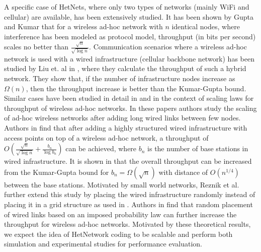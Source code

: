 \documentclass{sig-alternate-10pt}
\begin{document}
A specific case of HetNets, where only two types of networks (mainly WiFi and cellular) are available, has been extensively studied. It has been shown by Gupta and Kumar \cite{Gupta00thecapacity} that for a wireless ad-hoc network with $n$ identical nodes, where interference has been modeled as protocol model, throughput (in bits per second) scales no better than $\frac{\sqrt{n}}{\sqrt{\log{n}}}$. Communication scenarios where a wireless ad-hoc network is used with a wired infrastructure (cellular backbone network) has been studied by Liu et. al in  \cite{towsley03capacity}, where they calculate the throughput of such a hybrid network. They show that, if the number of infrastructure nodes increase as $\Omega(n)$, then the throughput increase is better than the Kumar-Gupta bound. Similar cases  have been studied in detail in  \cite{Kulkarni03throughputscaling} and \cite{Reznik04asmall} in the context of scaling laws for   throughput of  wireless ad-hoc networks. In these papers authors study the scaling of ad-hoc wireless networks after adding long wired links between few nodes.  Authors in \cite{Kulkarni03throughputscaling} find that after adding a highly structured wired infrastructure with access points  on top of a wireless ad-hoc network, a  throughput of $O(\frac{\sqrt{n}}{\sqrt{\log{n}}}+\frac{b_n}{\log{b_n}})$ can be achieved, where $b_n$ is the number of base stations in wired infrastructure. It is shown in \cite{Kulkarni03throughputscaling} that the overall throughput can be increased from the Kumar-Gupta bound  for $b_n=\Omega(\sqrt{n})$ with distance of $O({n^{1/4}})$ between the base stations. Motivated by small world networks, Reznik et al. \cite{Reznik04asmall} further extend this study by placing the wired infrastructure randomly instead of placing it in a grid structure as used in \cite{Kulkarni03throughputscaling}.  Authors in \cite{Reznik04asmall} find that random placement of wired links based on an imposed probability law can further increase the throughput for wireless ad-hoc networks. Motivated by these theoretical results, we expect the idea of HetNetwork coding to be scalable and perform both simulation and experimental studies for performance evaluation.
\end{document}
